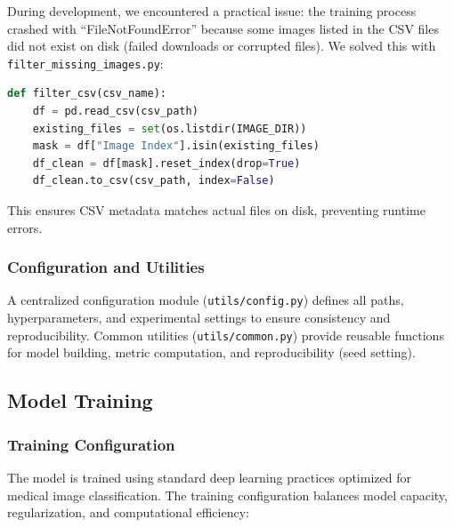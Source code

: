 \documentclass[12pt,a4paper]{article}
\begin{document}
During development, we encountered a practical issue: the training process crashed with ``FileNotFoundError'' because some images listed in the CSV files did not exist on disk (failed downloads or corrupted files). We solved this with \texttt{filter\_missing\_images.py}:

\begin{lstlisting}[language=Python, caption={Missing Image Filtering}]
def filter_csv(csv_name):
    df = pd.read_csv(csv_path)
    existing_files = set(os.listdir(IMAGE_DIR))
    mask = df["Image Index"].isin(existing_files)
    df_clean = df[mask].reset_index(drop=True)
    df_clean.to_csv(csv_path, index=False)
\end{lstlisting}

This ensures CSV metadata matches actual files on disk, preventing runtime errors.

\subsubsection{Configuration and Utilities}

A centralized configuration module (\texttt{utils/config.py}) defines all paths, hyperparameters, and experimental settings to ensure consistency and reproducibility. Common utilities (\texttt{utils/common.py}) provide reusable functions for model building, metric computation, and reproducibility (seed setting).

\subsection{Model Training}

\subsubsection{Training Configuration}

The model is trained using standard deep learning practices optimized for medical image classification. The training configuration balances model capacity, regularization, and computational efficiency:
\end{document}
